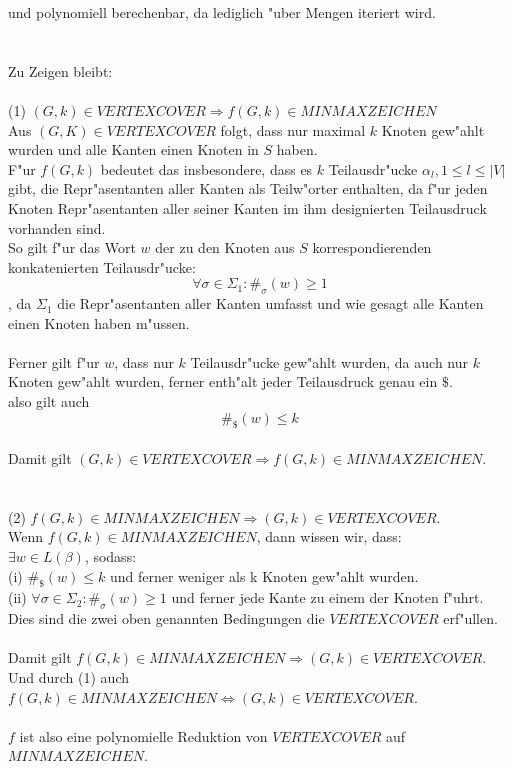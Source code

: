 \documentclass{article}
\newcommand{\gap}{\null\ \\ \\}
\newcommand{\RA}{\Rightarrow}
\newcommand{\Ra}{\Rightarrow}
\newcommand{\Lra}{\Leftrightarrow}
\begin{document}
    und polynomiell berechenbar,
    da lediglich "uber Mengen iteriert wird.\\
\gap
Zu Zeigen bleibt:\\
\\
(1) $(G,k) \in VERTEXCOVER \RA f(G,k) \in MINMAXZEICHEN$\\
Aus $(G,K) \in VERTEXCOVER$ folgt, dass nur maximal $k$ Knoten gew"ahlt wurden
    und alle Kanten einen Knoten in $S$ haben.\\
F"ur $f(G,k)$ bedeutet das insbesondere, dass es $k$ Teilausdr"ucke 
    $\alpha_l, 1 \leq l \leq |V|$ gibt, die Repr"asentanten aller Kanten als 
    Teilw"orter enthalten, da f"ur jeden Knoten Repr"asentanten aller seiner
    Kanten im ihm designierten Teilausdruck vorhanden sind.\\
So gilt f"ur das Wort $w$ der zu den Knoten aus $S$ korrespondierenden 
    konkatenierten Teilausdr"ucke:\[
        \forall \sigma \in \Sigma_1: \#_\sigma(w) \geq 1
    \]
, da $\Sigma_1$ die Repr"asentanten aller Kanten umfasst und wie gesagt alle 
    Kanten einen Knoten haben m"ussen.\\
\\
Ferner gilt f"ur $w$, dass nur $k$ Teilausdr"ucke gew"ahlt wurden, da auch nur $k$ 
    Knoten gew"ahlt wurden, ferner enth"alt jeder Teilausdruck genau ein $\$$.\\
also  gilt auch \[
        \#_\$(w) \leq k
    \]
\\
Damit gilt $(G,k) \in VERTEXCOVER \RA f(G,k) \in MINMAXZEICHEN$.\\
\gap
(2) $f(G,k) \in MINMAXZEICHEN \Ra (G,k) \in VERTEXCOVER$.\\
Wenn $f(G,k) \in MINMAXZEICHEN$, dann wissen wir, dass:\\
$\exists w \in L(\beta)$, sodass:\\
(i) $\#_\$(w) \leq k$ und ferner weniger als k Knoten gew"ahlt wurden.\\
(ii) $\forall \sigma \in \Sigma_2: \#_\sigma(w) \geq 1$ und ferner jede Kante
    zu einem der Knoten f"uhrt.\\
Dies sind die zwei oben genannten Bedingungen die $VERTEXCOVER$ erf"ullen.\\
\\
Damit gilt $f(G,k) \in MINMAXZEICHEN \Ra (G,k) \in VERTEXCOVER$.\\
Und durch (1) auch $f(G,k) \in MINMAXZEICHEN \Lra (G,k) \in VERTEXCOVER$.\\
\\
$f$ ist also eine polynomielle Reduktion von $VERTEXCOVER$ auf $MINMAXZEICHEN$.\\
\end{document}
